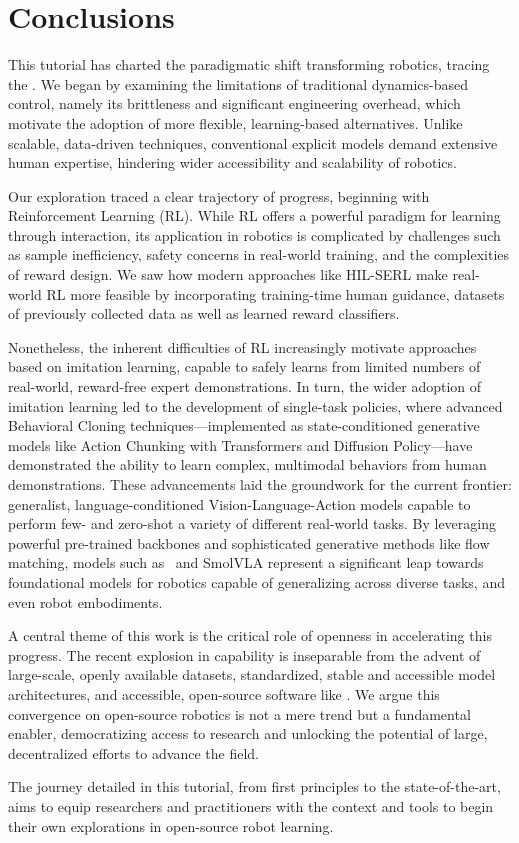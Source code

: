 \section{Conclusions}
\label{sec:conclusions}

This tutorial has charted the paradigmatic shift transforming robotics, tracing the . We began by examining the limitations of traditional dynamics-based control, namely its brittleness and significant engineering overhead, which motivate the adoption of more flexible, learning-based alternatives. Unlike scalable, data-driven techniques, conventional explicit models demand extensive human expertise, hindering wider accessibility and scalability of robotics.

Our exploration traced a clear trajectory of progress, beginning with Reinforcement Learning (RL). While RL offers a powerful paradigm for learning through interaction, its application in robotics is complicated by challenges such as sample inefficiency, safety concerns in real-world training, and the complexities of reward design. We saw how modern approaches like HIL-SERL make real-world RL more feasible by incorporating training-time human guidance, datasets of previously collected data as well as learned reward classifiers.

Nonetheless, the inherent difficulties of RL increasingly motivate approaches based on imitation learning, capable to safely learns from limited numbers of real-world, reward-free expert demonstrations. In turn, the wider adoption of imitation learning led to the development of single-task policies, where advanced Behavioral Cloning techniques---implemented as state-conditioned generative models like Action Chunking with Transformers and Diffusion Policy---have demonstrated the ability to learn complex, multimodal behaviors from human demonstrations. These advancements laid the groundwork for the current frontier: generalist, language-conditioned Vision-Language-Action models capable to perform few- and zero-shot a variety of different real-world tasks. By leveraging powerful pre-trained backbones and sophisticated generative methods like flow matching, models such as \pizero~and SmolVLA represent a significant leap towards foundational models for robotics capable of generalizing across diverse tasks, and even robot embodiments.

A central theme of this work is the critical role of openness in accelerating this progress. The recent explosion in capability is inseparable from the advent of large-scale, openly available datasets, standardized, stable and accessible model architectures, and accessible, open-source software like \lerobot. We argue this convergence on open-source robotics is not a mere trend but a fundamental enabler, democratizing access to research and unlocking the potential of large, decentralized efforts to advance the field.

The journey detailed in this tutorial, from first principles to the state-of-the-art, aims to equip researchers and practitioners with the context and tools to begin their own explorations in open-source robot learning.